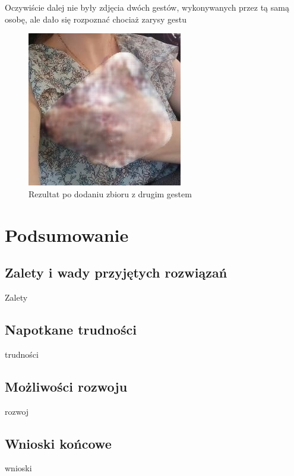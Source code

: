 \documentclass[12pt]{article}
\begin{document}
\begin{sloppypar}
{{    Oczywiście dalej nie były zdjęcia dwóch gestów, wykonywanych przez tą samą osobę, ale dało się rozpoznać chociaż zarysy gestu
    \begin{figure}
      \centering
      \includegraphics[width=.8\linewidth]{pix2pix/a7c3c2bf-fdaf-47a4-a976-280a1a4ad3dc.jpg}
      \caption{Rezultat po dodaniu zbioru z drugim gestem}
    \end{figure}
  }
}

\newpage

\section{Podsumowanie}
{
  \subsection{Zalety i wady przyjętych rozwiązań}
  {
    Zalety
  }
  \subsection{Napotkane trudności}
  {
    trudności
  }
  \subsection{Możliwości rozwoju}
  {
    rozwoj
  }
  \subsection{Wnioski końcowe}
  {
    wnioski
  }
}

\clearpage
\printbibliography[
  heading=bibintoc,
  title={Bibliografia}
]

\clearpage
\listoffigures

\clearpage
\listoftables

\clearpage
{}
\lstlistoflistings

\end{sloppypar}
\end{document}
